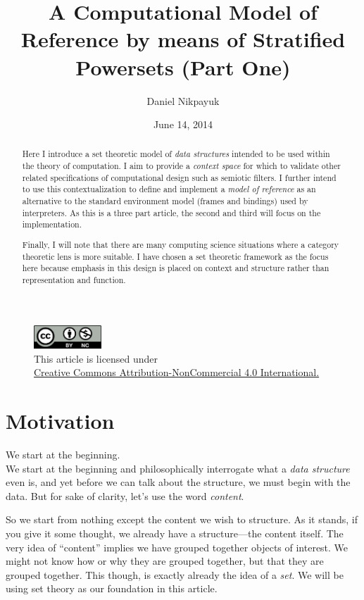 \documentclass[twoside]{article}
\title{A Computational Model of Reference by means of Stratified Powersets (Part One)}
\author{Daniel Nikpayuk}
\date{June 14, 2014}
\begin{document}
\maketitle
\thispagestyle{empty}

\begin{figure}[h]
\centering
\includegraphics[width=1in]{cc-by-nc.png}\\[0.1in]
\tiny This article is licensed under \\
\href{http://creativecommons.org/licenses/by-nc/4.0/}
{Creative Commons Attribution-NonCommercial 4.0 International.}\\[0.3in]
\end{figure}

\begin{abstract}
Here I introduce a set theoretic model of \emph{data structures} intended to be used within the theory of computation.
I aim to provide a \emph{context space} for which to validate other related specifications of computational design such
as semiotic filters. I further intend to use this contextualization to define and implement a \emph{model of reference}
as an alternative to the standard environment model (frames and bindings) used by interpreters. As this is a three part
article, the second and third will focus on the implementation.

Finally, I will note that there are many computing science situations where a category theoretic lens is more suitable.
I have chosen a set theoretic framework as the focus here because emphasis in this design is placed on context and structure
rather than representation and function.
\end{abstract}

\section*{Motivation}

We start at the beginning.\\[0.1cm]

We start at the beginning and philosophically interrogate what a \emph{data structure} even is, and yet before we can talk about
the structure, we must begin with the data. But for sake of clarity, let's use the word \emph{content}.

So we start from nothing except the content we wish to structure. As it stands, if you give it some
thought, we already have a structure---the content itself. The very idea of ``content'' implies we have grouped together
objects of interest. We might not know how or why they are grouped together, but that they are grouped together. This though,
is exactly already the idea of a \emph{set}. We will be using set theory as our foundation in this article.
\end{document}
